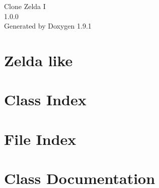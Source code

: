 \let\mypdfximage\pdfximage\def\pdfximage{\immediate\mypdfximage}\documentclass[twoside]{book}
\newcommand{\+}{\discretionary{\mbox{\scriptsize$\hookleftarrow$}}{}{}}
\newcommand{\clearemptydoublepage}{%
  \newpage{\pagestyle{empty}\cleardoublepage}%
}
\begin{document}
\raggedbottom

\begin{titlepage}
\vspace*{7cm}
\begin{center}%
{\Large Clone Zelda I \\[1ex]\large 1.\+0.\+0 }\\
\vspace*{1cm}
{\large Generated by Doxygen 1.9.1}\\
\end{center}
\end{titlepage}
\clearemptydoublepage
{}
\tableofcontents
\clearemptydoublepage
{}

\chapter{Zelda like}
\label{md__r_e_a_d_m_e}

\chapter{Class Index}

\chapter{File Index}

\chapter{Class Documentation}













\end{document}
